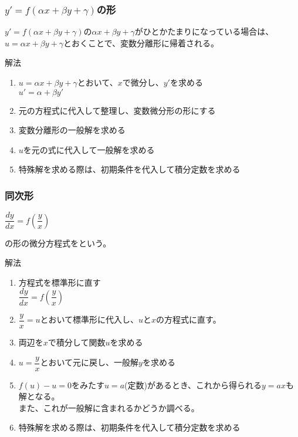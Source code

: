\documentclass[a4paper]{jsarticle}
\begin{document}
\subsubsection{$y'=f\left(\alpha x+\beta y+\gamma\right)$の形}
$y'=f\left(\alpha x+\beta y+\gamma\right)$の$\alpha x+\beta y+\gamma$がひとかたまりになっている場合は、
$u=\alpha x+\beta y+\gamma$とおくことで、変数分離形に帰着される。
\begin{itembox}[l]{解法}
    \begin{enumerate}[(1)]
        \item $u=\alpha x+\beta y+\gamma$とおいて、$x$で微分し、$y'$を求める
              \\$u'=\alpha+\beta y'$
        \item 元の方程式に代入して整理し、変数微分形の形にする
        \item 変数分離形の一般解を求める
        \item $u$を元の式に代入して一般解を求める
        \item 特殊解を求める際は、初期条件を代入して積分定数を求める
    \end{enumerate}
\end{itembox}
\subsubsection{同次形}
\begin{center}
    $\dfrac{dy}{dx}=f\left(\dfrac{y}{x}\right)$
\end{center}
の形の微分方程式をという。
\begin{itembox}[l]{解法}
    \begin{enumerate}[(1)]
        \item 方程式を標準形に直す\\
              $\dfrac{dy}{dx}=f\left(\dfrac{y}{x}\right)$
        \item $\dfrac{y}{x}=u$とおいて標準形に代入し、$u$と$x$の方程式に直す。
        \item 両辺を$x$で積分して関数$u$を求める
        \item $u=\dfrac{y}{x}$とおいて元に戻し、一般解$y$を求める
        \item $f\left(u\right)-u=0$をみたす$u=a$(定数)があるとき、これから得られる$y=ax$も解となる。\\
              また、これが一般解に含まれるかどうか調べる。
        \item 特殊解を求める際は、初期条件を代入して積分定数を求める
    \end{enumerate}
\end{itembox}
\end{document}
